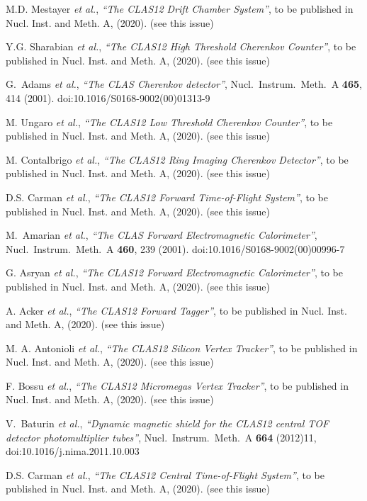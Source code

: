 \documentclass[final,3p]{elsarticle}
\begin{document}
\begin{twocolumn}
\begin{thebibliography}{99}
M.D. Mestayer {\it et al.}, {\it ``The CLAS12 Drift Chamber System''}, to be published in Nucl. Inst.
and Meth. A, (2020). (see this issue)

Y.G. Sharabian {\it et al.}, {\it ``The CLAS12 High Threshold Cherenkov Counter''}, to be published in Nucl. Inst.
and Meth. A, (2020). (see this issue)

G.~Adams {\it et al.}, {\it ``The CLAS Cherenkov detector''},
  Nucl.\ Instrum.\ Meth.\ A {\bf 465}, 414 (2001).
  doi:10.1016/S0168-9002(00)01313-9

M. Ungaro {\it et al.}, {\it ``The CLAS12 Low Threshold Cherenkov Counter''}, to be published in Nucl. Inst.
and Meth. A, (2020). (see this issue)

M. Contalbrigo {\it et al.}, {\it ``The CLAS12 Ring Imaging Cherenkov Detector''}, to be published in Nucl. Inst.
and Meth. A, (2020). (see this issue)

D.S. Carman {\it et al.}, {\it ``The CLAS12 Forward Time-of-Flight System''}, to be published in Nucl. Inst.
and Meth. A, (2020). (see this issue)

M.~Amarian {\it et al.}, {\it ``The CLAS Forward Electromagnetic Calorimeter''},
  Nucl.\ Instrum.\ Meth.\ A {\bf 460}, 239 (2001).
  doi:10.1016/S0168-9002(00)00996-7

G. Asryan {\it et al.}, {\it ``The CLAS12 Forward Electromagnetic Calorimeter''}, to be published in Nucl. Inst.
and Meth. A, (2020). (see this issue)

A. Acker {\it et al.}, {\it ``The CLAS12 Forward Tagger''}, to be published in Nucl. Inst.
and Meth. A, (2020). (see this issue)

M. A. Antonioli {\it et al.}, {\it ``The CLAS12 Silicon Vertex Tracker''}, to be published in Nucl. Inst.
and Meth. A, (2020). (see this issue)

F. Bossu {\it et al.}, {\it ``The CLAS12 Micromegas Vertex Tracker''}, to be published in Nucl. Inst.
and Meth. A, (2020). (see this issue)

V.~Baturin {\it et al.},
{\it  ``Dynamic magnetic shield for the CLAS12 central TOF detector photomultiplier tubes''},
  Nucl.\ Instrum.\ Meth.\ A {\bf 664} (2012)11, doi:10.1016/j.nima.2011.10.003

D.S. Carman {\it et al.}, {\it ``The CLAS12 Central Time-of-Flight System''}, to be published in Nucl. Inst.
and Meth. A, (2020). (see this issue)


\end{thebibliography}
\end{twocolumn}
\end{document}
